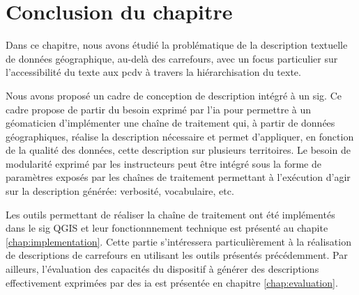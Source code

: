 \section{Conclusion du chapitre}

Dans ce chapitre, nous avons étudié la problématique de la description textuelle de données géographique, au-delà des carrefours, avec un focus particulier sur l'accessibilité du texte aux \gls{pcdv} à travers la hiérarchisation du texte. 

\newpar{}

Nous avons proposé un cadre de conception de description intégré à un \gls{sig}. Ce cadre propose de partir du besoin exprimé par l'\gls{ia} pour permettre à un géomaticien d'implémenter une chaîne de traitement qui, à partir de données géographiques, réalise la description nécessaire et permet d'appliquer, en fonction de la qualité des données, cette description sur plusieurs territoires. Le besoin de modularité exprimé par les instructeurs peut être intégré sous la forme de paramètres exposés par les chaînes de traitement permettant à l'exécution d'agir sur la description générée: verbosité, vocabulaire, etc. 

\newpar{}

Les outils permettant de réaliser la chaîne de traitement ont été implémentés dans le \gls{sig} QGIS et leur fonctionnnement technique est présenté au chapite \ref{chap:implementation}. Cette partie s'intéressera particulièrement à la réalisation de descriptions de carrefours en utilisant les outils présentés précédemment. Par ailleurs, l'évaluation des capacités du dispositif à générer des descriptions effectivement exprimées par des \gls{ia} est présentée en chapitre \ref{chap:evaluation}.